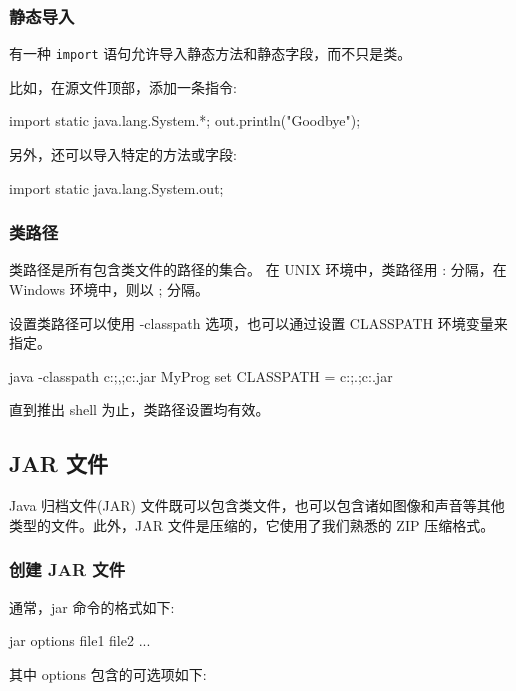 \subsubsection{静态导入}

有一种 \texttt{import} 语句允许导入静态方法和静态字段，而不只是类。

比如，在源文件顶部，添加一条指令:
\begin{Java}
import static java.lang.System.*;
out.println("Goodbye");
\end{Java}

另外，还可以导入特定的方法或字段:
\begin{Java}
import static java.lang.System.out;
\end{Java}

\subsubsection{类路径}

类路径是所有包含类文件的路径的集合。
在 UNIX 环境中，类路径用 : 分隔，在 Windows 环境中，则以 ; 分隔。

设置类路径可以使用 -classpath 选项，也可以通过设置 CLASSPATH 环境变量来指定。

\begin{Java}
java -classpath c:\classdir;,;c:\archives\archive.jar MyProg
set CLASSPATH = c:\classdir;.;c:\archives\archive.jar
\end{Java}

直到推出 shell 为止，类路径设置均有效。

\subsection{JAR 文件}

Java 归档文件(JAR) 文件既可以包含类文件，也可以包含诸如图像和声音等其他类型的文件。此外，JAR 文件是压缩的，它使用了我们熟悉的 ZIP 压缩格式。

\subsubsection{创建 JAR 文件}

通常，jar 命令的格式如下:
\begin{Java}
jar options file1 file2 ...
\end{Java}

其中 options 包含的可选项如下:

